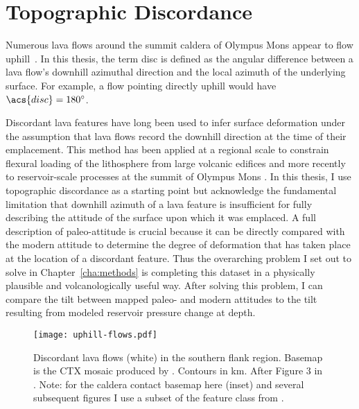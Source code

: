 \section{Topographic Discordance}\label{sec:discordance}

Numerous lava flows around the summit caldera of Olympus Mons appear to flow uphill~\parencite[Figure~\ref{fig:uphill-flows}; after][]{mouginis-mark_late-stage_2019}. In this thesis, the term \ac{disc} is defined as the angular difference between a lava flow's downhill azimuthal direction and the local azimuth of the underlying surface. For example, a flow pointing directly uphill would have $\acs{disc}=\ang{180}$. 

Discordant lava features have long been used to infer surface deformation under the assumption that lava flows record the downhill direction at the time of their emplacement. This method has been applied at a regional scale to constrain flexural loading of the lithosphere from large volcanic edifices \parencite{mouginis-mark_ancient_1982,isherwood_volcanic_2013,chadwick_late_2015} and more recently to reservoir-scale processes at the summit of Olympus Mons \parencite{mouginis-mark_late-stage_2019}. In this thesis, I use topographic discordance as a starting point but acknowledge the fundamental limitation that downhill azimuth of a lava feature is insufficient for fully describing the attitude of the surface upon which it was emplaced. A full description of paleo-attitude is crucial because it can be directly compared with the modern attitude to determine the degree of deformation that has taken place at the location of a discordant feature. Thus the overarching problem I set out to solve in Chapter~\ref{cha:methods} is completing this dataset in a physically plausible and volcanologically useful way. After solving this problem, I can compare the tilt between mapped paleo- and modern attitudes to the tilt resulting from modeled reservoir pressure change at depth.

\begin{figure}
    \centering
    \texttt{[image: uphill-flows.pdf]}
    \caption[Discordant lava flows]{Discordant lava flows (white) in the southern flank region. Basemap is the \acf{CTX} mosaic produced by \textcite{Dickson2018AGB}. Contours in \unit{\km}. After Figure 3 in \textcite{mouginis-mark_late-stage_2019}. Note: for the caldera contact basemap here (inset) and several subsequent figures I use a subset of the feature class from \textcite{mouginis-mark_geologic_2021}.}%
    \label{fig:uphill-flows}
\end{figure}

